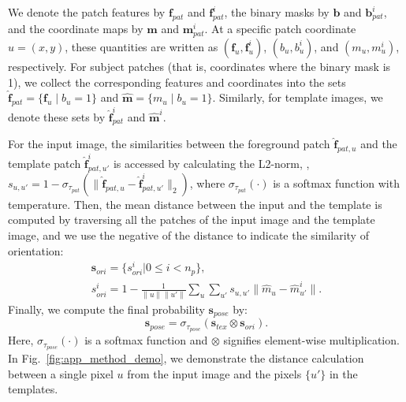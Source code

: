 We denote the patch features by $\boldsymbol{f}_{pat}$ and $\boldsymbol{f}_{pat}^i$, the binary masks by $\boldsymbol{b}$ and $\boldsymbol{b}_{pat}^i$, and the coordinate maps by $\boldsymbol{m}$ and $\boldsymbol{m}_{pat}^i$. At a specific patch coordinate $u = (x, y)$, these quantities are written as $(\boldsymbol{f}_u, \boldsymbol{f}_u^i)$, $(b_u, b_u^i)$, and $(m_u, m_u^i)$, respectively. For subject patches (that is, coordinates where the binary mask is 1), we collect the corresponding features and coordinates into the sets $\hat{\boldsymbol{f}}_{pat} = \{\boldsymbol{f}_u \mid b_u = 1\}$ and $\hat{\boldsymbol{m}} = \{m_u \mid b_u = 1\}$. Similarly, for template images, we denote these sets by $\hat{\boldsymbol{f}}_{pat}^i$ and $\hat{\boldsymbol{m}}^i$.






For the input image, the similarities between the foreground patch $\hat{\boldsymbol{f}}_{pat, u}$ and the template patch $\hat{\boldsymbol{f}}_{pat, u'}^i$ is accessed by calculating the L2-norm, \ie, $s_{u, u'}= 1 - \sigma_{\tau_{pat}}(\|\hat{\boldsymbol{f}}_{pat, u} - \hat{\boldsymbol{f}}_{pat, u'}^i\|_2)$, where $\sigma_{\tau_{pat}}(\cdot)$ is a softmax function with temperature. Then, the mean distance between the input and the template is computed by traversing all the patches of the input image and the template image, and we use the negative of the distance to indicate the similarity of orientation:
\begin{equation}\label{eq:cls_pose}
    \begin{gathered}
 \boldsymbol{s}_{ori} = \{s_{ori}^i | 0 \leq i < n_p\}, \\
 s^i_{ori} = 1 - \frac{1}{\|u\|\|u'\|}\sum_{u}\sum_{u'} s_{u,u'}\|\hat{m}_u-\hat{m}_{u'}^i\|.
    \end{gathered}
\end{equation}
Finally, we compute the final probability $\boldsymbol{s}_{pose}$ by:
\begin{equation}
 \boldsymbol{s}_{pose} = \sigma_{\tau_{pose}}(\boldsymbol{s}_{tex} \otimes \boldsymbol{s}_{ori}).
\end{equation}
Here, $\sigma_{\tau_{pose}}(\cdot)$ is a softmax function and $\otimes$ signifies element-wise multiplication. In Fig.~\ref{fig:app_method_demo}, we demonstrate the distance calculation between a single pixel $u$ from the input image and the pixels $\{u'\}$ in the templates.



